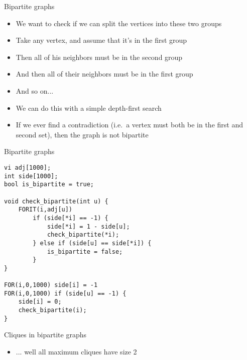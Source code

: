 \documentclass[12pt,t]{beamer}
\newcommand{\bi}{\begin{itemize}}
\newcommand{\ei}{\end{itemize}}
\begin{document}
\begin{frame}{Bipartite graphs}
    \vspace{10pt}
    \bi
        \item We want to check if we can split the vertices into these two groups
        \item Take any vertex, and assume that it's in the first group
        \item Then all of his neighbors must be in the second group
        \item And then all of their neighbors must be in the first group
        \item And so on...
        \vspace{10pt}
        \item We can do this with a simple depth-first search
        \item If we ever find a contradiction (i.e.\ a vertex must both be in the first and second set), then the graph is not bipartite
    \ei
\end{frame}

\begin{frame}[fragile]{Bipartite graphs}
    \begin{verbatim}
vi adj[1000];
int side[1000];
bool is_bipartite = true;

void check_bipartite(int u) {
    FORIT(i,adj[u])
        if (side[*i] == -1) {
            side[*i] = 1 - side[u];
            check_bipartite(*i);
        } else if (side[u] == side[*i]) {
            is_bipartite = false;
        }
}

FOR(i,0,1000) side[i] = -1
FOR(i,0,1000) if (side[u] == -1) {
    side[i] = 0;
    check_bipartite(i);
}
    \end{verbatim}
\end{frame}

\begin{frame}{Cliques in bipartite graphs}
    \bi
        \item ... well all maximum cliques have size 2
    \ei
\end{frame}
\end{document}
